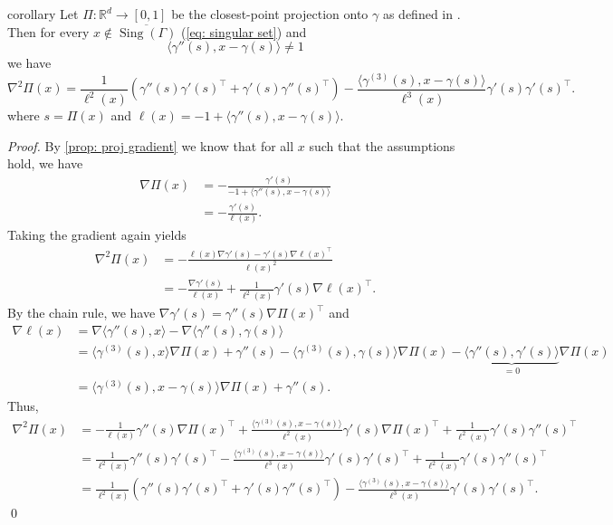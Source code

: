 \documentclass[11pt]{article}
\begin{document}
\begin{restatable}{corollary}{} \label{prop: proj hessian}
    Let $\Pi: \mathbb{R}^d \rightarrow [0, 1]$ be the closest-point projection onto $\gamma$ as defined in . Then for every $x \notin \overline{\operatorname{Sing}(\Gamma)}$ (\cref{eq: singular set}) and 
    \[\langle\gamma''(s), x - \gamma(s)\rangle \neq 1\]
    we have
    \[\nabla^2\Pi(x) = \frac{1}{\ell^2(x)}\left(\gamma''(s)\gamma'(s)^{\top} + \gamma'(s)\gamma''(s)^{\top}\right)- \frac{\langle\gamma^{(3)}(s), x - \gamma(s)\rangle}{\ell^3(x)}\gamma'(s)\gamma'(s)^{\top}.\]
    where $s = \Pi(x)$ and $\ell(x) = -1 + \langle\gamma''(s), x-\gamma(s)\rangle$.
\end{restatable}
\noindent \textit{Proof.} By \cref{prop: proj gradient} we know that for all $x$ such that the assumptions hold, we have
\begin{align}
    \nabla\Pi(x) &= -\frac{\gamma'(s)}{-1 + \langle\gamma''(s), x - \gamma(s)\rangle} \\
    &= -\frac{\gamma'(s)}{\ell(x)}.
\end{align}
Taking the gradient again yields
\begin{align}
    \nabla^2\Pi(x) &= -\frac{\ell(x)\nabla \gamma'(s) - \gamma'(s)\nabla \ell(x)^{\top}}{\ell(x)^2} \\
    &= -\frac{\nabla \gamma'(s)}{\ell(x)} + \frac{1}{\ell^2(x)}\gamma'(s)\nabla \ell(x)^{\top}.
\end{align}
By the chain rule, we have $\nabla\gamma'(s) = \gamma''(s)\nabla\Pi(x)^{\top}$ and 
\begin{align}
    \nabla \ell(x) &= \nabla\langle\gamma''(s), x\rangle -\nabla\langle \gamma''(s), \gamma(s)\rangle \\
    &= \langle \gamma^{(3)}(s), x\rangle \nabla\Pi(x) + \gamma''(s) - \langle\gamma^{(3)}(s), \gamma(s)\rangle\nabla\Pi(x) - \underbrace{\langle\gamma''(s), \gamma'(s)\rangle}_{= 0}\nabla\Pi(x) \\
    &= \langle\gamma^{(3)}(s), x - \gamma(s)\rangle\nabla\Pi(x) + \gamma''(s).
\end{align}
Thus,
\begin{align*}
    \nabla^2\Pi(x) &= -\frac{1}{\ell(x)}\gamma''(s)\nabla\Pi(x)^{\top} + \frac{\langle\gamma^{(3)}(s), x - \gamma(s)\rangle}{\ell^2(x)}\gamma'(s)\nabla\Pi(x)^{\top} + \frac{1}{\ell^2(x)}\gamma'(s)\gamma''(s)^{\top} \\
    &= \frac{1}{\ell^2(x)}\gamma''(s)\gamma'(s)^{\top} - \frac{\langle\gamma^{(3)}(s), x - \gamma(s)\rangle}{\ell^3(x)}\gamma'(s)\gamma'(s)^{\top} + \frac{1}{\ell^2(x)}\gamma'(s)\gamma''(s)^{\top} \\
    &= \frac{1}{\ell^2(x)}\left(\gamma''(s)\gamma'(s)^{\top} + \gamma'(s)\gamma''(s)^{\top}\right)- \frac{\langle\gamma^{(3)}(s), x - \gamma(s)\rangle}{\ell^3(x)}\gamma'(s)\gamma'(s)^{\top}.
\end{align*}
\qed{}
\end{document}
